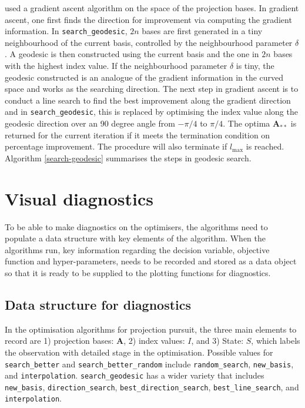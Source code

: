\citet{cook1995grand} used a gradient ascent algorithm on the space of the projection bases. In gradient ascent, one first finds the direction for improvement via computing the gradient information. In \texttt{search\_geodesic}, \(2n\) bases are first generated in a tiny neighbourhood of the current basis, controlled by the neighbourhood parameter \(\delta\). A geodesic is then constructed using the current basis and the one in \(2n\) bases with the highest index value. If the neighbourhood parameter \(\delta\) is tiny, the geodesic constructed is an analogue of the gradient information in the curved space and works as the searching direction. The next step in gradient ascent is to conduct a line search to find the best improvement along the gradient direction and in \texttt{search\_geodesic}, this is replaced by optimising the index value along the geodesic direction over an 90 degree angle from \(-\pi/4\) to \(\pi/4\). The optima \(\mathbf{A}_{**}\) is returned for the current iteration if it meets the termination condition on percentage improvement. The procedure will also terminate if \(l_{\max}\) is reached. Algorithm \ref{search-geodesic} summarises the steps in geodesic search.

\hypertarget{vis-diag}{%
\section{Visual diagnostics}\label{vis-diag}}

To be able to make diagnostics on the optimisers, the algorithms need to populate a data structure with key elements of the algorithm. When the algorithms run, key information regarding the decision variable, objective function and hyper-parameters, needs to be recorded and stored as a data object so that it is ready to be supplied to the plotting functions for diagnostics.

\hypertarget{data-structure-for-diagnostics}{%
\subsection{Data structure for diagnostics}\label{data-structure-for-diagnostics}}

In the optimisation algorithms for projection pursuit, the three main elements to record are 1) projection bases: \(\mathbf{A}\), 2) index values: \(I\), and 3) State: \(S\), which labels the observation with detailed stage in the optimisation. Possible values for \texttt{search\_better} and \texttt{search\_better\_random} include \texttt{random\_search}, \texttt{new\_basis}, and \texttt{interpolation}. \texttt{search\_geodesic} has a wider variety that includes \texttt{new\_basis}, \texttt{direction\_search}, \texttt{best\_direction\_search}, \texttt{best\_line\_search}, and \texttt{interpolation}.

